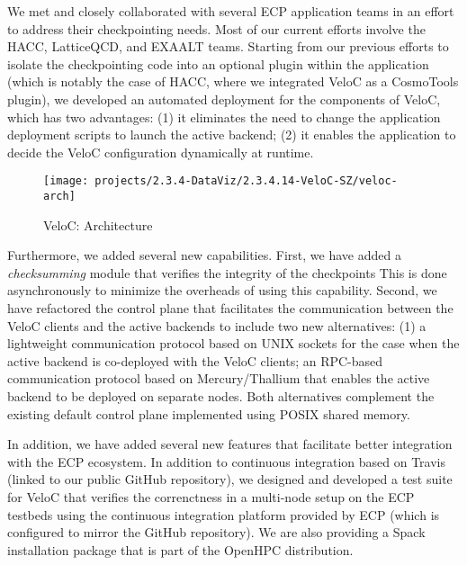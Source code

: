 We met and closely collaborated with several ECP application teams in
an effort to address their checkpointing needs. Most of our current
efforts involve the HACC, LatticeQCD, and EXAALT teams. Starting from
our previous efforts to isolate the checkpointing code into an optional
plugin within the application (which is notably the case of HACC, where
we integrated VeloC as a CosmoTools plugin), we developed an automated
deployment for the components of VeloC, which has two advantages: (1)
it eliminates the need to change the application deployment scripts
to launch the active backend; (2) it enables the application to decide
the VeloC configuration dynamically at runtime.

\begin{wrapfigure}{l}{0.47\textwidth}
  \texttt{[image: projects/2.3.4-DataViz/2.3.4.14-VeloC-SZ/veloc-arch]}
  \caption{VeloC: Architecture}%
  \label{fig:veloc:arch}%
\end{wrapfigure}

Furthermore, we added several new capabilities. First, we have added
a \emph{checksumming} module that verifies the integrity of the checkpoints
This is done asynchronously to minimize the overheads of using this capability.
Second, we have refactored the control plane that facilitates the communication
between the VeloC clients and the active backends to include two new alternatives:
(1) a lightweight communication protocol based on UNIX sockets for the case
when the active backend is co-deployed with the VeloC clients; an RPC-based
communication protocol based on Mercury/Thallium that enables the active
backend to be deployed on separate nodes. Both alternatives complement the
existing default control plane implemented using POSIX shared memory.

In addition, we have added several new features that facilitate better
integration with the ECP ecosystem. In addition to continuous
integration based on Travis (linked to our public GitHub repository),
we designed and developed a test suite for VeloC that verifies the
correnctness in a multi-node setup on the ECP testbeds using the
continuous integration platform provided by ECP (which is configured to
mirror the GitHub repository). We are also providing a Spack
installation package that is part of the OpenHPC distribution.

